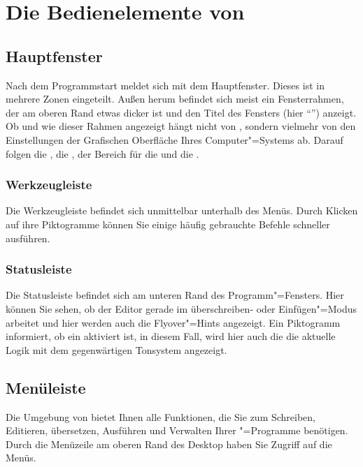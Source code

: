 \part{Die Bedienelemente von \texorpdfstring{\mutabor}{Mutabor}}

\chapter{Hauptfenster}\label{sec:DE_MAINWINDOW}

Nach dem Programmstart meldet sich \mutabor{} mit dem Hauptfenster.
Dieses ist in mehrere Zonen eingeteilt. Außen herum befindet sich
meist ein Fensterrahmen, der am oberen Rand etwas dicker ist und den
Titel des Fensters (hier "`\mutabor"') anzeigt. Ob und wie dieser
Rahmen angezeigt hängt nicht von \mutabor{}, sondern vielmehr von den
Einstellungen der Grafischen Oberfläche Ihres Computer"=Systems ab.
Darauf folgen die , die
, der Bereich für die
 und die
.

\section{Werkzeugleiste}\label{sec:DE_TOOLBAR}
Die Werkzeugleiste befindet sich unmittelbar unterhalb des Menüs.
Durch Klicken auf ihre Piktogramme können Sie einige häufig gebrauchte
Befehle schneller ausführen.

\section{Statusleiste}\label{sec:DE_STATUS}
Die Statusleiste befindet sich am unteren Rand des Programm"=Fensters.
Hier können Sie sehen, ob der Editor gerade im überschreiben- oder
Einfügen"=Modus arbeitet und hier werden auch die Flyover"=Hints
angezeigt. Ein Piktogramm informiert, ob ein
 aktiviert ist, in diesem
Fall, wird hier auch die  die
aktuelle Logik mit dem gegenwärtigen Tonsystem angezeigt.


\chapter{Menüleiste}
\label{sec:DE_MENU}
Die Umgebung von \mutabor{} bietet Ihnen alle Funktionen, die Sie zum
Schreiben, Editieren, übersetzen, Ausführen und Verwalten Ihrer
\mutabor{}"=Programme benötigen. Durch die Menüzeile am oberen Rand
des Desktop haben Sie Zugriff auf die Menüs.

